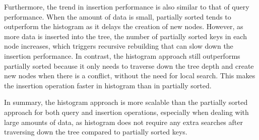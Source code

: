 Furthermore, the trend in insertion performance is also similar to that of query performance. When the amount of data is small, partially sorted tends to outperform the histogram as it delays the creation of new nodes. However, as more data is inserted into the tree, the number of partially sorted keys in each node increases, which triggers recursive rebuilding that can slow down the insertion performance. In contrast, the histogram approach still outperforms partially sorted because it only needs to traverse down the tree depth and create new nodes when there is a conflict, without the need for local search. This makes the insertion operation faster in histogram than in partially sorted.

In summary, the histogram approach is more scalable than the partially sorted approach for both query and insertion operations, especially when dealing with large amounts of data, as histogram does not require any extra searches after traversing down the tree compared to partially sorted keys.
